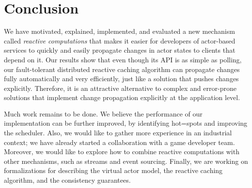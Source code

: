 \section{Conclusion}

We have motivated, explained, implemented, and evaluated a new mechanism called \emph{reactive computations} that makes it easier for developers of actor-based services to quickly and easily propagate changes in actor states to clients that depend on it. Our results show that even though its API is as simple as polling, our fault-tolerant distributed reactive caching algorithm can propagate changes fully automatically and very efficiently, just like a solution that pushes changes explicitly. Therefore, it is an attractive alternative to complex and error-prone solutions that implement change propagation explicitly at the application level.

Much work remains to be done. We believe the performance of our implementation can be further improved, by identifying hot=spots and improving the scheduler. Also, we would like to gather more experience in an industrial context; we have already started a collaboration with a game developer team. Moreover, we would like to explore how to combine reactive computations with other mechanisms, such as streams and event sourcing. Finally, we are working on formalizations for describing the virtual actor model, the reactive caching algorithm, and the consistency guarantees.